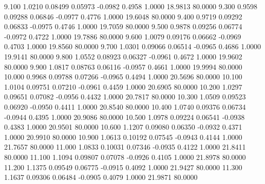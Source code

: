    9.100   1.0210   0.08499   0.05973  -0.0982   0.4958   1.0000  18.9813  80.0000
   9.300   0.9598   0.09288   0.06846  -0.0977   0.4776   1.0000  19.6048  80.0000
   9.400   0.9719   0.09292   0.06833  -0.0975   0.4746   1.0000  19.7059  80.0000
   9.500   0.9878   0.09256   0.06774  -0.0972   0.4722   1.0000  19.7886  80.0000
   9.600   1.0079   0.09176   0.06662  -0.0969   0.4703   1.0000  19.8560  80.0000
   9.700   1.0301   0.09066   0.06514  -0.0965   0.4686   1.0000  19.9141  80.0000
   9.800   1.0552   0.08923   0.06327  -0.0961   0.4672   1.0000  19.9602  80.0000
   9.900   1.0817   0.08763   0.06116  -0.0957   0.4661   1.0000  19.9994  80.0000
  10.000   0.9968   0.09788   0.07266  -0.0965   0.4494   1.0000  20.5696  80.0000
  10.100   1.0104   0.09751   0.07210  -0.0961   0.4459   1.0000  20.6905  80.0000
  10.200   1.0297   0.09651   0.07082  -0.0956   0.4432   1.0000  20.7817  80.0000
  10.300   1.0509   0.09523   0.06920  -0.0950   0.4411   1.0000  20.8540  80.0000
  10.400   1.0740   0.09376   0.06734  -0.0944   0.4395   1.0000  20.9086  80.0000
  10.500   1.0978   0.09224   0.06541  -0.0938   0.4383   1.0000  20.9501  80.0000
  10.600   1.1207   0.09080   0.06350  -0.0932   0.4371   1.0000  20.9910  80.0000
  10.900   1.0613   0.10192   0.07545  -0.0943   0.4144   1.0000  21.7657  80.0000
  11.000   1.0833   0.10031   0.07346  -0.0935   0.4122   1.0000  21.8411  80.0000
  11.100   1.1094   0.09807   0.07078  -0.0926   0.4105   1.0000  21.8978  80.0000
  11.200   1.1375   0.09549   0.06775  -0.0915   0.4092   1.0000  21.9427  80.0000
  11.300   1.1637   0.09306   0.06484  -0.0905   0.4079   1.0000  21.9871  80.0000
